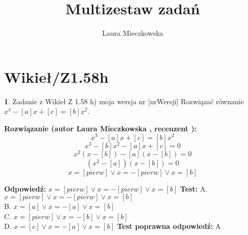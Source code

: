 \documentclass[12pt, a4paper]{article}
\title{Multizestaw zadań}
\author{Laura Mieczkowska}
\date{}
\theoremstyle{definition} %
\newtheorem{zad}{}
\newcommand{\kategoria}[1]{\section{#1}} %
\newcommand{\zadStart}[1]{\begin{zad}#1\newline} %
\newcommand{\zadStop}{\end{zad}}   %
\newcommand{\rozwStart}[2]{\noindent \textbf{Rozwiązanie (autor #1 , recenzent #2): }\newline} %
\newcommand{\odpStart}{\noindent \textbf{Odpowiedź:}\newline}    %
\newcommand{\odpStop}{\newline}                                             %
\newcommand{\testStart}{\noindent \textbf{Test:}\newline} %
\newcommand{\testStop}{\newline} %
\newcommand{\kluczStart}{\noindent \textbf{Test poprawna odpowiedź:}\newline} %
\newcommand{\kluczStop}{\newline} %
\begin{document}
\maketitle


\kategoria{Wikieł/Z1.58h}
\zadStart{Zadanie z Wikieł Z 1.58 h) moja wersja nr [nrWersji]}
Rozwiązać równanie $x^3-[a]x+[c]=[b]x^2$.
\zadStop
\rozwStart{Laura Mieczkowska}{}
$$x^3-[a]x+[c]=[b]x^2$$
$$x^3-[b]x^2-[a]x+[c]=0$$
$$x^2(x-[b])-[a](x-[b])=0$$
$$(x^2-[a])(x-[b])=0$$
$$x=[pierw] \vee x=-[pierw] \vee x=[b]$$

\odpStart
$x=[pierw] \vee x=-[pierw] \vee x=[b]$
\odpStop
\testStart
A. $x=[pierw] \vee x=-[pierw] \vee x=[b]$ \\
B. $x=[a] \vee x=-[a] \vee x=[b]$ \\
C. $x=[pierw] \vee x=-[b] \vee x=[b]$ \\
D. $x=[c] \vee x=-[a] \vee x=[b]$ 
\testStop
\kluczStart
A
\kluczStop
\end{document}
